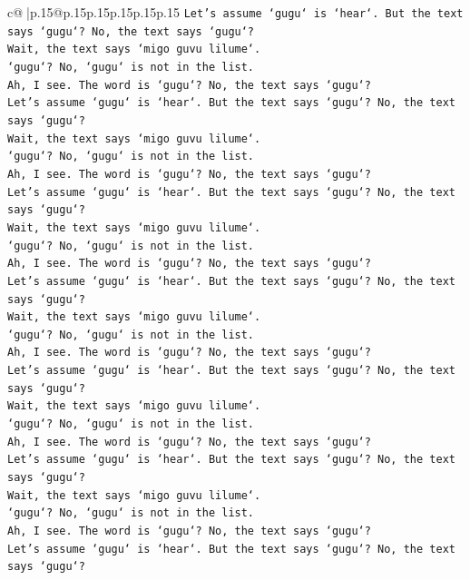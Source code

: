\documentclass{article}
\begin{document}
{\begin{supertabular}{c@{$\;$}|p{.15\linewidth}@{}p{.15\linewidth}p{.15\linewidth}p{.15\linewidth}p{.15\linewidth}p{.15\linewidth}}
{{{\texttt{Let's assume `gugu` is `hear`. But the text says `gugu`? No, the text says `gugu`?} \\
\texttt{Wait, the text says `migo guvu lilume`.} \\
\texttt{`gugu`? No, `gugu` is not in the list.} \\
\texttt{Ah, I see. The word is `gugu`? No, the text says `gugu`?} \\
\texttt{Let's assume `gugu` is `hear`. But the text says `gugu`? No, the text says `gugu`?} \\
\texttt{Wait, the text says `migo guvu lilume`.} \\
\texttt{`gugu`? No, `gugu` is not in the list.} \\
\texttt{Ah, I see. The word is `gugu`? No, the text says `gugu`?} \\
\texttt{Let's assume `gugu` is `hear`. But the text says `gugu`? No, the text says `gugu`?} \\
\texttt{Wait, the text says `migo guvu lilume`.} \\
\texttt{`gugu`? No, `gugu` is not in the list.} \\
\texttt{Ah, I see. The word is `gugu`? No, the text says `gugu`?} \\
\texttt{Let's assume `gugu` is `hear`. But the text says `gugu`? No, the text says `gugu`?} \\
\texttt{Wait, the text says `migo guvu lilume`.} \\
\texttt{`gugu`? No, `gugu` is not in the list.} \\
\texttt{Ah, I see. The word is `gugu`? No, the text says `gugu`?} \\
\texttt{Let's assume `gugu` is `hear`. But the text says `gugu`? No, the text says `gugu`?} \\
\texttt{Wait, the text says `migo guvu lilume`.} \\
\texttt{`gugu`? No, `gugu` is not in the list.} \\
\texttt{Ah, I see. The word is `gugu`? No, the text says `gugu`?} \\
\texttt{Let's assume `gugu` is `hear`. But the text says `gugu`? No, the text says `gugu`?} \\
\texttt{Wait, the text says `migo guvu lilume`.} \\
\texttt{`gugu`? No, `gugu` is not in the list.} \\
\texttt{Ah, I see. The word is `gugu`? No, the text says `gugu`?} \\
\texttt{Let's assume `gugu` is `hear`. But the text says `gugu`? No, the text says `gugu`?} \\
}}}
\end{supertabular}}
\end{document}
